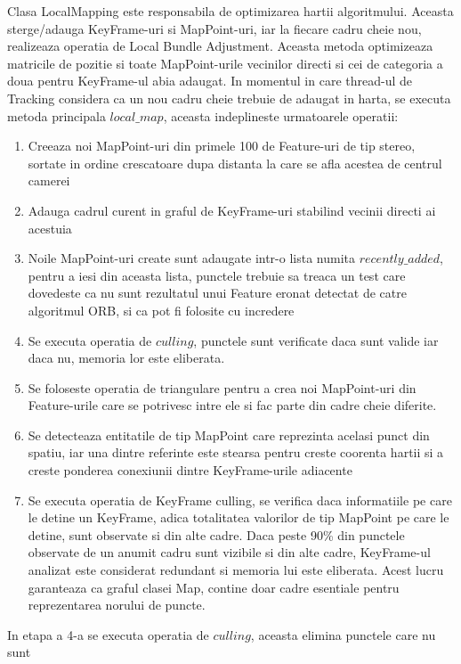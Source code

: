 \documentclass[12pt,a4paper]{report}
\begin{document}
Clasa LocalMapping este responsabila de optimizarea hartii algoritmului. Aceasta sterge/adauga KeyFrame-uri
si MapPoint-uri, iar la fiecare cadru cheie nou, realizeaza operatia de Local Bundle 
Adjustment. Aceasta metoda optimizeaza matricile de pozitie si toate MapPoint-urile vecinilor 
directi si cei de categoria a doua pentru KeyFrame-ul abia adaugat. In momentul in care 
thread-ul de Tracking considera ca un nou cadru cheie trebuie de adaugat in harta, se executa
metoda principala $ local\_map $, aceasta indeplineste urmatoarele operatii:
\begin{enumerate}
    \item Creeaza noi MapPoint-uri din primele 100 de Feature-uri de tip stereo, 
sortate in ordine crescatoare dupa distanta la care se afla acestea de centrul camerei  
    \item Adauga cadrul curent in graful de KeyFrame-uri stabilind vecinii directi ai
acestuia 
    \item Noile MapPoint-uri create sunt adaugate intr-o lista numita $ recently\_added $,
pentru a iesi din aceasta lista, punctele trebuie sa treaca un test care dovedeste ca 
nu sunt rezultatul unui Feature eronat detectat de catre algoritmul ORB, si ca pot fi 
folosite cu incredere
    \item Se executa operatia de $ culling $, punctele sunt verificate daca sunt valide iar
daca nu, memoria lor este eliberata.
    \item Se foloseste operatia de triangulare pentru a crea noi MapPoint-uri din 
Feature-urile care se potrivesc intre ele si fac parte din cadre cheie diferite.
    \item Se detecteaza entitatile de tip MapPoint care reprezinta acelasi punct
din spatiu, iar una dintre referinte este stearsa pentru creste coorenta hartii si 
a creste ponderea conexiunii dintre KeyFrame-urile adiacente    
    \item Se executa operatia de KeyFrame culling, se verifica daca informatiile pe 
care le detine un KeyFrame, adica totalitatea valorilor de tip MapPoint pe care le 
detine, sunt observate si din alte cadre. Daca peste 90\% din punctele observate de un 
anumit cadru sunt vizibile si din alte cadre, KeyFrame-ul analizat este considerat redundant
si memoria lui este eliberata. Acest lucru garanteaza ca graful clasei Map, contine 
doar cadre esentiale pentru reprezentarea norului de puncte. 
\end{enumerate}
In etapa a 4-a se executa operatia de $ culling $, aceasta elimina punctele care nu sunt
\end{document}
